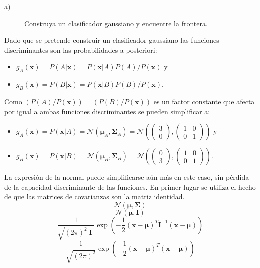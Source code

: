 \documentclass[11pt,a4paper,final]{article}
\begin{document}
\begin{description}
\item[a)] Construya un clasificador gaussiano y encuentre la frontera.
\end{description}
Dado que se pretende construir un clasificador gaussiano las funciones discriminantes son las probabilidades a posteriori:
\begin{itemize}
\item $g_A(\mathbf{x})=P(A|\mathbf{x}) = P(\mathbf{x}|A) P(A) / P(\mathbf{x})$ y
\item $g_B(\mathbf{x})=P(B|\mathbf{x}) = P(\mathbf{x}|B) P(B) / P(\mathbf{x})$.
\end{itemize} 
Como $(P(A)/P(\mathbf{x}))=(P(B)/P(\mathbf{x}))$ es un factor constante que afecta por igual a ambas funciones discriminantes se pueden simplificar a:
\begin{itemize}
\item $g_A(\mathbf{x})= P(\mathbf{x}|A) = \mathcal{N}\left( {\boldsymbol \mu}_A,{\boldsymbol\Sigma}_A \right) = \mathcal{N}\left( 
\left(\begin{matrix}3\\0 \end{matrix}\right) ,
\left(\begin{matrix}1 & 0\\0 & 1 \end{matrix} \right) 
\right)$ y
\item $g_B(\mathbf{x})= P(\mathbf{x}|B) = \mathcal{N}\left( {\boldsymbol \mu}_B,{\boldsymbol\Sigma}_B \right) = \mathcal{N}\left( 
\left(\begin{matrix}0\\3 \end{matrix}\right) ,
\left(\begin{matrix}1 & 0\\0 & 1 \end{matrix} \right) 
\right)$.
\end{itemize}
La expresión de la normal puede simplificarse aún más en este caso, sin pérdida de la capacidad discriminante de las funciones. En primer lugar se utiliza el hecho de que las matrices de covarianzas son la matriz identidad. 
\[\mathcal{N}\left( {\boldsymbol \mu},{\boldsymbol\Sigma} \right)\]
\[\mathcal{N}\left( {\boldsymbol \mu},{\boldsymbol I} \right)\]
\[\frac{1}{\sqrt{(2\pi)^2|\boldsymbol I|}}
\exp\left(-\frac{1}{2}({\mathbf x}-{\boldsymbol\mu})^T{\boldsymbol I}^{-1}({\mathbf x}-{\boldsymbol\mu})
\right)\]
\[\frac{1}{\sqrt{(2\pi)^2}}
\exp\left(-\frac{1}{2}({\mathbf x}-{\boldsymbol\mu})^T({\mathbf x}-{\boldsymbol\mu})
\right)\]
\end{document}
